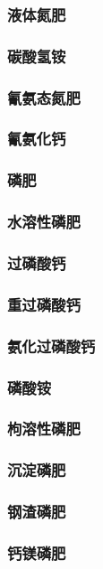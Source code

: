 \documentclass[UTF8]{../../ApplicationUniverse}
\begin{document}
    \subsubsection{液体氮肥}
    \subsubsection{碳酸氢铵}
    \subsubsection{氰氨态氮肥}
        \subsubsection{氰氨化钙}
\subsubsection{磷肥}
    \subsubsection{水溶性磷肥}
        \subsubsection{过磷酸钙}
        \subsubsection{重过磷酸钙}
        \subsubsection{氨化过磷酸钙}
        \subsubsection{磷酸铵}
    \subsubsection{枸溶性磷肥}
        \subsubsection{沉淀磷肥}
        \subsubsection{钢渣磷肥}
        \subsubsection{钙镁磷肥}
\end{document}
